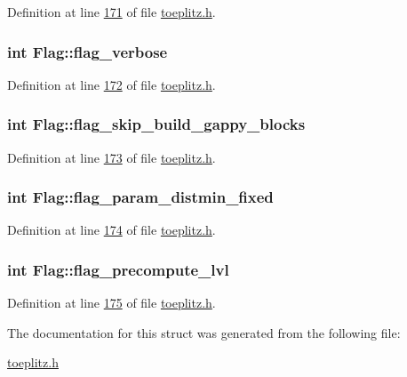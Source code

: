 Definition at line \hyperlink{toeplitz_8h_source_l00171}{171} of file \hyperlink{toeplitz_8h_source}{toeplitz.\-h}.

\hypertarget{structFlag_a2a95d22f9f2430453cfba79d30f12f98}{
\subsubsection[{flag\-\_\-verbose}]{\setlength{\rightskip}{0pt plus 5cm}int Flag\-::flag\-\_\-verbose}}\label{structFlag_a2a95d22f9f2430453cfba79d30f12f98}


Definition at line \hyperlink{toeplitz_8h_source_l00172}{172} of file \hyperlink{toeplitz_8h_source}{toeplitz.\-h}.

\hypertarget{structFlag_a554392271ddce269c1f562aaecd4a17b}{
\subsubsection[{flag\-\_\-skip\-\_\-build\-\_\-gappy\-\_\-blocks}]{\setlength{\rightskip}{0pt plus 5cm}int Flag\-::flag\-\_\-skip\-\_\-build\-\_\-gappy\-\_\-blocks}}\label{structFlag_a554392271ddce269c1f562aaecd4a17b}


Definition at line \hyperlink{toeplitz_8h_source_l00173}{173} of file \hyperlink{toeplitz_8h_source}{toeplitz.\-h}.

\hypertarget{structFlag_a51e7368d87f7d743dbf7c04dde411af1}{
\subsubsection[{flag\-\_\-param\-\_\-distmin\-\_\-fixed}]{\setlength{\rightskip}{0pt plus 5cm}int Flag\-::flag\-\_\-param\-\_\-distmin\-\_\-fixed}}\label{structFlag_a51e7368d87f7d743dbf7c04dde411af1}


Definition at line \hyperlink{toeplitz_8h_source_l00174}{174} of file \hyperlink{toeplitz_8h_source}{toeplitz.\-h}.

\hypertarget{structFlag_a479c04f9761b9b91c55362f491df0ea1}{
\subsubsection[{flag\-\_\-precompute\-\_\-lvl}]{\setlength{\rightskip}{0pt plus 5cm}int Flag\-::flag\-\_\-precompute\-\_\-lvl}}\label{structFlag_a479c04f9761b9b91c55362f491df0ea1}


Definition at line \hyperlink{toeplitz_8h_source_l00175}{175} of file \hyperlink{toeplitz_8h_source}{toeplitz.\-h}.



The documentation for this struct was generated from the following file\-:\begin{DoxyCompactItemize}
\item 
\hyperlink{toeplitz_8h}{toeplitz.\-h}\end{DoxyCompactItemize}
